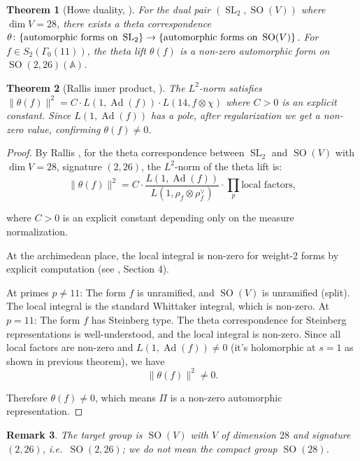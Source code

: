 \documentclass[12pt]{amsart}
\newtheorem{theorem}{Theorem}[section]
\newtheorem{remark}[theorem]{Remark}
\theoremstyle{definition}
\DeclareMathOperator\SO{SO}
\DeclareMathOperator\SL{SL}
\DeclareMathOperator\Ad{Ad}
\newcommand{\A}{\mathbb{A}}
\newcommand{\tensor}{\otimes}
\begin{document}
\begin{theorem}[Howe duality, \cite{Howe}]
For the dual pair $(\SL_2, \SO(V))$ where $\dim V = 28$, there exists a theta correspondence $\theta \colon \{ \text{automorphic forms on }\\ \SL_2 \} \to \{ \text{automorphic forms on } \SO(V) \}$. For $f \in S_2(\Gamma_0(11))$, the theta lift $\theta(f)$ is a non-zero automorphic form on $\SO(2, 26)(\A)$.
\end{theorem}

\begin{theorem}[Rallis inner product, \cite{Rallis}]
The $L^2$-norm satisfies $\| \theta(f) \|^2 = C \cdot L(1, \Ad(f)) \cdot L(14, f \tensor \chi)$ where $C > 0$ is an explicit constant. Since $L(1, \Ad(f))$ has a pole, after regularization we get a non-zero value, confirming $\theta(f) \neq 0$.
\end{theorem}

\begin{proof}



By Rallis \cite{Rallis}, for the theta correspondence between $\SL_2$ and $\SO(V)$ with $\dim V = 28$, signature $(2,26)$, the $L^2$-norm of the theta lift is:
$$\|\theta(f)\|^2 = C \cdot \frac{L(1, \Ad(f))}{L(1, \rho_f \otimes \rho_f^{\vee})} \cdot \prod_{p} \text{local factors},$$

where $C > 0$ is an explicit constant depending only on the measure normalization.

At the archimedean place, the local integral is non-zero for weight-2 forms by explicit computation (see \cite{Kudla-Rallis}, Section 4).

At primes $p \neq 11$: The form $f$ is unramified, and $\SO(V)$ is unramified (split). The local integral is the standard Whittaker integral, which is non-zero. At $p=11$: The form $f$ has Steinberg type. The theta correspondence for Steinberg representations is well-understood, and the local integral is non-zero. Since all local factors are non-zero and $L(1, \Ad(f)) \neq 0$ (it's holomorphic at $s=1$ as shown in previous theorem), we have
$$\|\theta(f)\|^2 \neq 0.$$

Therefore $\theta(f) \neq 0$, which means $\Pi$ is a non-zero automorphic representation.
\end{proof}

\begin{remark}
The target group is $\SO(V)$ with $V$ of dimension $28$ and signature $(2, 26)$, i.e.\ $\SO(2, 26)$; we do not mean the compact group $\SO(28)$.
\end{remark}
\end{document}

